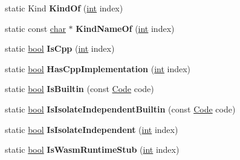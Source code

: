 \begin{DoxyCompactItemize}
\item 
\mbox{\label{classv8_1_1internal_1_1Builtins_a47729e5d97a951d231cb22102ff8186b}} 
static Kind {\bfseries Kind\+Of} (\mbox{\hyperlink{classint}{int}} index)
\item 
\mbox{\label{classv8_1_1internal_1_1Builtins_a6793f0911197fdbd0dd9b610ee1a5520}} 
static const \mbox{\hyperlink{classchar}{char}} $\ast$ {\bfseries Kind\+Name\+Of} (\mbox{\hyperlink{classint}{int}} index)
\item 
\mbox{\label{classv8_1_1internal_1_1Builtins_a3066ad3eb117789d90b75910725b7942}} 
static \mbox{\hyperlink{classbool}{bool}} {\bfseries Is\+Cpp} (\mbox{\hyperlink{classint}{int}} index)
\item 
\mbox{\label{classv8_1_1internal_1_1Builtins_a62827e5559e2709d34280fda92d44a15}} 
static \mbox{\hyperlink{classbool}{bool}} {\bfseries Has\+Cpp\+Implementation} (\mbox{\hyperlink{classint}{int}} index)
\item 
\mbox{\label{classv8_1_1internal_1_1Builtins_ac9aa9163053340aaac705e1307fc2249}} 
static \mbox{\hyperlink{classbool}{bool}} {\bfseries Is\+Builtin} (const \mbox{\hyperlink{classv8_1_1internal_1_1Code}{Code}} code)
\item 
\mbox{\label{classv8_1_1internal_1_1Builtins_a6594cc4a034ad5dda3c1b45416da3e56}} 
static \mbox{\hyperlink{classbool}{bool}} {\bfseries Is\+Isolate\+Independent\+Builtin} (const \mbox{\hyperlink{classv8_1_1internal_1_1Code}{Code}} code)
\item 
\mbox{\label{classv8_1_1internal_1_1Builtins_a98079a960b2bc6e22518064e5a691f44}} 
static \mbox{\hyperlink{classbool}{bool}} {\bfseries Is\+Isolate\+Independent} (\mbox{\hyperlink{classint}{int}} index)
\item 
\mbox{\label{classv8_1_1internal_1_1Builtins_ab4e8a172c4b24e9ccda30df0cd28193c}} 
static \mbox{\hyperlink{classbool}{bool}} {\bfseries Is\+Wasm\+Runtime\+Stub} (\mbox{\hyperlink{classint}{int}} index)

\end{DoxyCompactItemize}
